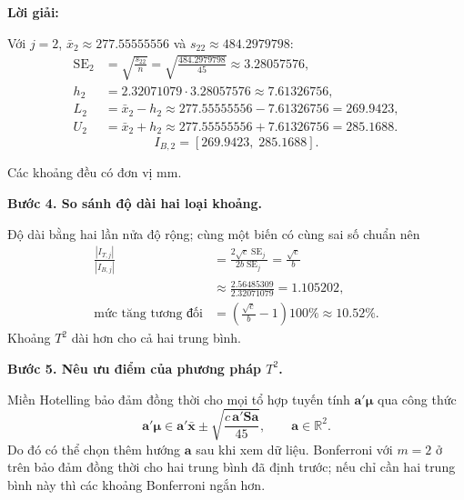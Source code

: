 \documentclass[11pt,a4paper]{article}
\renewcommand{\boldsymbol}[1]{\symbf{#1}}
\newenvironment{solution}{%
  \par\medskip\noindent\textbf{Lời giải:}\par\nobreak\smallskip\noindent\ignorespaces
}{\par}
\newcommand{\answer}[1]{\boxed{#1}}
\newcommand{\step}[2]{\par\medskip\noindent\textbf{Bước #1. #2}\par\nopagebreak[4]\smallskip\noindent}
\begin{document}
\begin{solution}
\begin{enumerate}[label=\textbf{\alph*)}]
\begin{samepage}
Với $j=2$, $\bar{x}_2\approx277.55555556$ và $s_{22}\approx484.2979798$:
\begin{align*}
\operatorname{SE}_{2}&=\sqrt{\frac{s_{22}}{n}}
=\sqrt{\frac{484.2979798}{45}}\approx3.28057576,\\
h_{2}&=2.32071079\cdot3.28057576\approx7.61326756,\\
L_{2}&=\bar{x}_{2}-h_{2}
\approx 277.55555556-7.61326756=269.9423,\\
U_{2}&=\bar{x}_{2}+h_{2}
\approx 277.55555556+7.61326756=285.1688.
\end{align*}
\[
\answer{I_{B,2}=[269.9423,\;285.1688]}.
\]
\end{samepage}

Các khoảng đều có đơn vị mm.
\step{4}{So sánh độ dài hai loại khoảng.}
Độ dài bằng hai lần nửa độ rộng; cùng một biến có cùng sai số chuẩn nên
\begin{align*}
\frac{|I_{T,j}|}{|I_{B,j}|}
&=\frac{2\sqrt{c}\operatorname{SE}_j}{2b\operatorname{SE}_j}
=\frac{\sqrt{c}}b\\
&\approx\frac{2.56485309}{2.32071079}=1.105202,\\
\text{mức tăng tương đối}&=\left(\frac{\sqrt{c}}b-1\right)100\%
\approx10.52\%.
\end{align*}
Khoảng $T^2$ dài hơn cho cả hai trung bình.
\step{5}{Nêu ưu điểm của phương pháp $T^2$.}
Miền Hotelling bảo đảm đồng thời cho mọi tổ hợp tuyến tính
$\mathbf{a}'\boldsymbol{\mu}$ qua công thức
\[
\answer{\mathbf{a}'\boldsymbol{\mu}\in\mathbf{a}'\bar{\mathbf{x}}
\pm\sqrt{\frac{c\,\mathbf{a}'\mathbf{S}\mathbf{a}}{45}}},
\qquad\mathbf{a}\in\mathbb{R}^2.
\]
Do đó có thể chọn thêm hướng $\mathbf{a}$ sau khi xem dữ liệu.
Bonferroni với $m=2$ ở trên bảo đảm đồng thời cho hai trung bình đã định trước;
nếu chỉ cần hai trung bình này thì các khoảng Bonferroni ngắn hơn.
\end{enumerate}
\end{solution}
\end{document}
